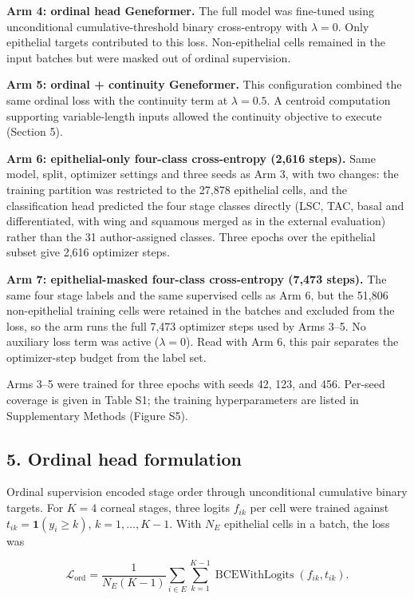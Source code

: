 \documentclass[12pt,letterpaper]{article}
\begin{document}
\textbf{Arm 4: ordinal head Geneformer.} The full model was fine-tuned using unconditional cumulative-threshold binary cross-entropy with $\lambda=0$. Only epithelial targets contributed to this loss. Non-epithelial cells remained in the input batches but were masked out of ordinal supervision.

\textbf{Arm 5: ordinal + continuity Geneformer.} This configuration combined the same ordinal loss with the continuity term at $\lambda=0.5$. A centroid computation supporting variable-length inputs allowed the continuity objective to execute (Section 5).

\textbf{Arm 6: epithelial-only four-class cross-entropy (2{,}616 steps).} Same model, split, optimizer settings and three seeds as Arm 3, with two changes: the training partition was restricted to the 27{,}878 epithelial cells, and the classification head predicted the four stage classes directly (LSC, TAC, basal and differentiated, with wing and squamous merged as in the external evaluation) rather than the 31 author-assigned classes. Three epochs over the epithelial subset give 2{,}616 optimizer steps.

\textbf{Arm 7: epithelial-masked four-class cross-entropy (7{,}473 steps).} The same four stage labels and the same supervised cells as Arm 6, but the 51{,}806 non-epithelial training cells were retained in the batches and excluded from the loss, so the arm runs the full 7{,}473 optimizer steps used by Arms 3--5. No auxiliary loss term was active ($\lambda = 0$). Read with Arm 6, this pair separates the optimizer-step budget from the label set.

Arms 3--5 were trained for three epochs with seeds 42, 123, and 456. Per-seed coverage is given in Table S1; the training hyperparameters are listed in Supplementary Methods (Figure S5).

\subsection*{5. Ordinal head formulation}

Ordinal supervision encoded stage order through unconditional cumulative binary targets. For $K=4$ corneal stages, three logits $f_{ik}$ per cell were trained against $t_{ik}=\mathbf 1(y_i\ge k)$, $k=1,\ldots,K-1$. With $N_E$ epithelial cells in a batch, the loss was

\[
\mathcal L_{\mathrm{ord}}=
\frac{1}{N_E(K-1)}
\sum_{i\in E}\sum_{k=1}^{K-1}
\operatorname{BCEWithLogits}(f_{ik},t_{ik}).
\]
\end{document}
